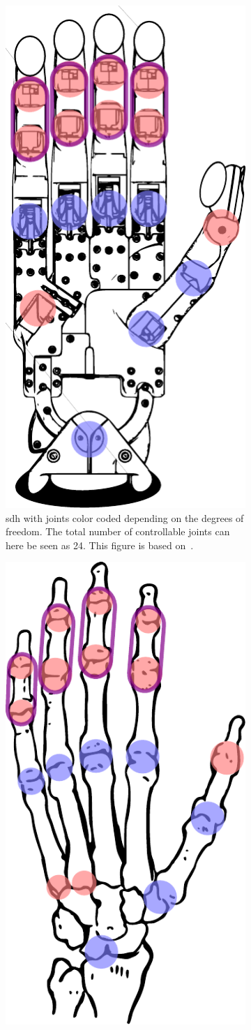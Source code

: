\begin{figure}[h]
	\centering
	\begin{subfigure}[b]{0.48\textwidth}
		\centering
		\includegraphics[height=\textwidth]{chapters/system-setup/fig/robot-hand-skeleton-coupled.pdf}
		\caption{\gls{sdh} with joints color coded depending on the degrees of freedom. The total number of controllable joints can here be seen as \num{24}. This figure is based on~\cite{svg-robot-hand}.}
		\label{fig:robot-hand-skeleton}
	\end{subfigure}
	\hfill
	\begin{subfigure}[b]{0.48\textwidth}
		\centering
		\includegraphics[height=\textwidth]{chapters/system-setup/fig/human-skeleton-hand-coupled.pdf}

\end{subfigure}
\end{figure}
